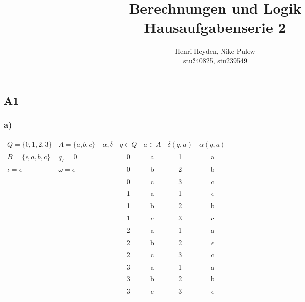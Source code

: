\documentclass[12pt, a4paper]{article}
\title{Berechnungen und Logik\\Hausaufgabenserie 2}
\author{Henri Heyden, Nike Pulow \\ \small stu240825, stu239549}
\date{}
\begin{document}
\maketitle

\doublespacing

\subsection*{A1}

\subsubsection*{a)}

\begin{tabular}{l l || c c c c c}
    \( Q = \{ 0, 1, 2, 3 \} \) & \(A = \{a, b, c\}\)&\( \alpha, \delta \)&\( q \in Q \) & \( a \in A \) & \( \delta (q, a) \) & \( \alpha(q, a) \) \\ [0.5ex]
    \(B = \{ \epsilon, a, b, c \} \) & \(q_I = 0\) &&0 & a & 1 & a \\
    \( \iota = \epsilon\) & \(\omega = \epsilon\)&&0 & b & 2 & b \\
    &&&0 & c & 3 & c \\
    &&&1 & a & 1 & \(\epsilon\) \\
    &&&1 & b & 2 & b \\
    &&&1 & c & 3 & c \\
    &&&2 & a & 1 & a \\
    &&&2 & b & 2 & \( \epsilon \) \\
    &&&2 & c & 3 & c \\
    &&&3 & a & 1 & a \\
    &&&3 & b & 2 & b \\
    &&&3 & c & 3 & \( \epsilon \)\\[0.5ex]
\end{tabular}\\
\pagebreak
\end{document}
